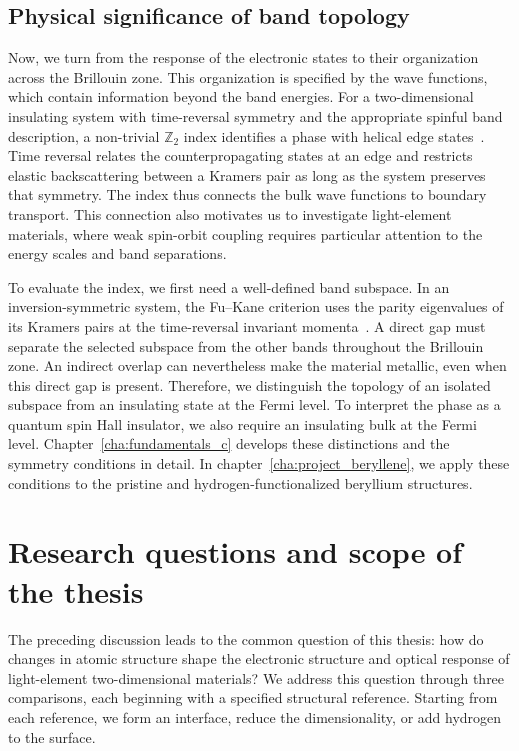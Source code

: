 \FloatBarrier
\subsection{Physical significance of band topology}
\label{subsec:topo_motivation}

Now, we turn from the response of the electronic states to their organization across the Brillouin zone.
This organization is specified by the wave functions, which contain information beyond the band energies.
For a two-dimensional insulating system with time-reversal symmetry and the appropriate spinful band description, a non-trivial $\mathbb{Z}_2$ index identifies a phase with helical edge states~\cite{fu2007topological,hasan2010colloquium}.
Time reversal relates the counterpropagating states at an edge and restricts elastic backscattering between a Kramers pair as long as the system preserves that symmetry.
The index thus connects the bulk wave functions to boundary transport.
This connection also motivates us to investigate light-element materials, where weak spin-orbit coupling requires particular attention to the energy scales and band separations.

To evaluate the index, we first need a well-defined band subspace.
In an inversion-symmetric system, the Fu--Kane criterion uses the parity eigenvalues of its Kramers pairs at the time-reversal invariant momenta~\cite{fu2007topological}.
A direct gap must separate the selected subspace from the other bands throughout the Brillouin zone.
An indirect overlap can nevertheless make the material metallic, even when this direct gap is present.
Therefore, we distinguish the topology of an isolated subspace from an insulating state at the Fermi level.
To interpret the phase as a quantum spin Hall insulator, we also require an insulating bulk at the Fermi level.
Chapter~\ref{cha:fundamentals_c} develops these distinctions and the symmetry conditions in detail.
In chapter~\ref{cha:project_beryllene}, we apply these conditions to the pristine and hydrogen-functionalized beryllium structures.

\FloatBarrier
\section{Research questions and scope of the thesis}
\label{sec:intro_gaps}

The preceding discussion leads to the common question of this thesis: how do changes in atomic structure shape the electronic structure and optical response of light-element two-dimensional materials?
We address this question through three comparisons, each beginning with a specified structural reference.
Starting from each reference, we form an interface, reduce the dimensionality, or add hydrogen to the surface.


